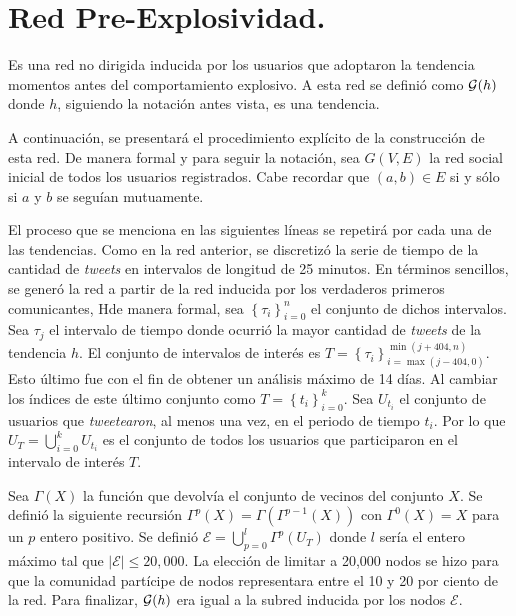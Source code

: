 \documentclass[../main.tex]{subfiles}
\begin{document}
\section{Red Pre-Explosividad.}

Es una red no dirigida inducida por los usuarios que adoptaron la tendencia momentos antes del comportamiento explosivo. A esta red se definió como $\mathcal{G}(h)$ donde $h$, siguiendo la notación antes vista, es una tendencia.

A continuación, se presentará el procedimiento explícito de la construcción de esta red. De manera formal y para seguir la notación, sea $G(V,E)$ la red social inicial de todos los usuarios registrados. Cabe recordar que $(a,b) \in E$ si y sólo si $a$ y $b$ se seguían mutuamente. 

El proceso que se menciona en las siguientes líneas se repetirá por cada una de las tendencias. Como en la red anterior, se discretizó la serie de tiempo de la cantidad de \textit{tweets} en intervalos de longitud de 25 minutos. En términos sencillos, se generó la red a partir de la red inducida por los verdaderos primeros comunicantes, Hde manera formal, sea $\left\{ \tau_{i} \right\}_{i=0}^{n}$ el conjunto de dichos intervalos. Sea $\tau_{j}$ el intervalo de tiempo donde ocurrió la mayor cantidad de \textit{tweets} de la tendencia $h$. El conjunto de intervalos de interés es $T = \left\{ \tau_{i} \right\}_{i=\max(j - 404,0)}^{\min(j+404,n)}$. Esto último fue con el fin de obtener un análisis máximo de 14 días. Al cambiar los índices de este último conjunto como $T = \left\{ t_{i} \right\}_{i = 0}^{k}$. 
Sea $U_{t_i}$ el conjunto de usuarios que \textit{tweetearon}, al menos una vez, en el periodo de tiempo $t_i$. Por lo que $U_T = \bigcup_{i = 0}^{k} U_{t_i} $ es el conjunto de todos los usuarios que participaron en el intervalo de interés $T$. 

Sea $\Gamma(X)$ la función que devolvía el conjunto de vecinos del conjunto $X$. Se definió la siguiente recursión $\Gamma^{p}(X) = \Gamma(\Gamma^{p-1}(X)) $ con $\Gamma^{0}(X) = X $ para un $p$ entero positivo. Se definió $\mathcal{E} = \bigcup_{p = 0}^{l} \Gamma^{p}(U_T)$ donde $l$ sería el entero máximo tal que $\left| \mathcal{E} \right| \leq 20,000$. La elección de limitar a 20,000 nodos se hizo para que la comunidad partícipe de nodos representara entre el 10 y 20 por ciento de la red. Para finalizar, $\mathcal{G}(h)$ era igual a la subred inducida por los nodos $\mathcal{E}$. 

\end{document}
